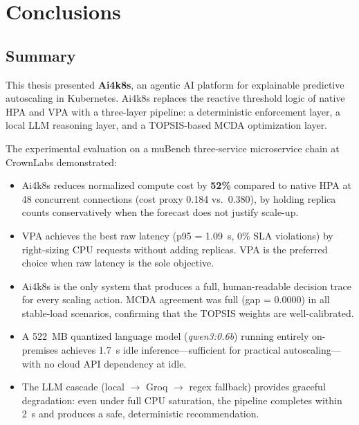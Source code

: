 \chapter{Conclusions}
\label{ch:conclusions}

\section{Summary}
\label{sec:summary}

This thesis presented \textbf{Ai4k8s}, an agentic AI platform for explainable
predictive autoscaling in Kubernetes. Ai4k8s replaces the reactive threshold logic
of native HPA and VPA with a three-layer pipeline: a deterministic enforcement
layer, a local LLM reasoning layer, and a TOPSIS-based MCDA optimization layer.

The experimental evaluation on a muBench three-service microservice chain at
CrownLabs demonstrated:

\begin{itemize}
  \item Ai4k8s reduces normalized compute cost by \textbf{52\%} compared to
  native HPA at 48 concurrent connections (cost proxy 0.184 vs.\ 0.380), by
  holding replica counts conservatively when the forecast does not justify
  scale-up.

  \item VPA achieves the best raw latency (p95 = 1.09~s, 0\% SLA violations)
  by right-sizing CPU requests without adding replicas. VPA is the preferred
  choice when raw latency is the sole objective.

  \item Ai4k8s is the only system that produces a full, human-readable
  decision trace for every scaling action. MCDA agreement was full
  (gap = 0.0000) in all stable-load scenarios, confirming that the TOPSIS
  weights are well-calibrated.

  \item A 522~MB quantized language model (\textit{qwen3:0.6b}) running
  entirely on-premises achieves 1.7~s idle inference—sufficient for practical
  autoscaling—with no cloud API dependency at idle.

  \item The LLM cascade (local $\to$ Groq $\to$ regex fallback) provides
  graceful degradation: even under full CPU saturation, the pipeline completes
  within 2~s and produces a safe, deterministic recommendation.
\end{itemize}

